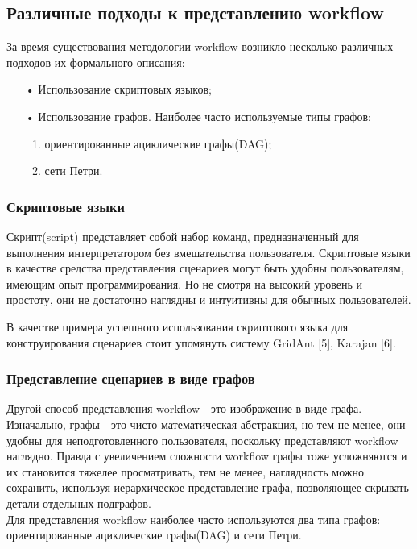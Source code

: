 \documentclass[a4paper,12pt]{article}
\begin{document}
\subsection{Различные подходы к представлению workflow}

За время существования методологии workflow возникло несколько различных подходов их формального описания:
\begin{enumerate}
\item[•] Использование скриптовых языков;

\item[•] Использование графов. Наиболее часто используемые типы графов:
	\begin{enumerate}
		\item ориентированные ациклические графы(DAG);
		\item сети Петри.
	\end{enumerate}
\end{enumerate}
\subsubsection{Скриптовые языки}
Скрипт(script) представляет собой набор команд, предназначенный для выполнения интерпретатором без вмешательства пользователя. 
 Скриптовые языки в качестве средства представления сценариев могут быть удобны пользователям, имеющим опыт программирования. Но не смотря на высокий уровень и простоту, они не достаточно наглядны и интуитивны для обычных пользователей.
 
В качестве примера успешного использования скриптового языка для
конструирования сценариев стоит упомянуть систему GridAnt [5], Karajan [6].
 
 
\subsubsection{Представление сценариев в виде графов}
Другой способ представления workflow  - это изображение в виде графа. Изначально, графы - это чисто математическая абстракция, но тем не менее, они удобны для неподготовленного пользователя, поскольку представляют workflow наглядно.
Правда с увеличением сложности workflow графы тоже усложняются и их становится тяжелее просматривать, тем не менее, наглядность можно сохранить, используя иерархическое представление графа, позволяющее скрывать детали отдельных подграфов.\\
Для представления workflow наиболее часто используются два типа графов:
ориентированные ациклические графы(DAG) и сети Петри.
\end{document}
